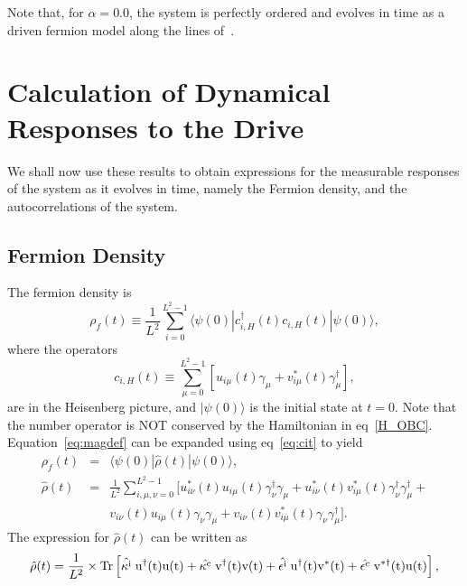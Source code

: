 \documentclass[a4paper,10pt]{article}
\begin{document}
Note that, for $\alpha=0.0$, the system is perfectly ordered and evolves in time as a driven fermion model along the lines of~\cite{arnab1}. 

\section{Calculation of Dynamical Responses to the Drive}
\label{sec:responses}
We shall now use these results to obtain expressions for the measurable responses of the system as it evolves in time, namely the  Fermion density, and the autocorrelations of the system. 

\subsection{Fermion Density}
\label{subsec:magcalc}
The fermion density is~\cite{arnab1} 
\begin{equation}
\label{eq:magdef}
\rho_f(t)\equiv  \frac{1}{L^2}\sum^{L^2-1}_{i=0} \langle \psi(0) | c^\dagger_{i,H} (t) c_{i,H}(t) |\psi(0)\rangle,
\end{equation}
where the operators 
\begin{equation}
\label{eq:cit}
c_{i,H}(t)\equiv \sum^{L^2-1}_{\mu=0} \left[u_{i\mu}(t)\gamma_\mu+v^\ast_{i\mu}(t)\gamma^\dagger_\mu\right],
\end{equation}
are in the Heisenberg picture, and $|\psi(0)\rangle$ is the initial state at $t=0$. Note that the number operator is NOT conserved by the Hamiltonian in eq~\ref{H_OBC}. Equation~\ref{eq:magdef} can be expanded using eq~\ref{eq:cit} to yield
\begin{eqnarray}
\label{eq:magops}
 \rho_f(t) &=& \langle\psi(0)|\hat{\rho}(t)|\psi(0)\rangle,\nonumber \\
 \hat{\rho}(t) &=& \frac{1}{L^2}\sum^{L^2-1}_{i,\mu,\nu = 0}\bigg[u^\ast_{i\nu}(t) u_{i\mu}(t)\gamma^\dagger_\nu\gamma_\mu + u^\ast_{i\nu}(t)v^\ast_{i\mu}(t)\gamma^\dagger_\nu\gamma^\dagger_\mu + \nonumber \\
  & & v_{i\nu}(t)u_{i\mu}(t)\gamma_\nu\gamma_\mu + v_{i\nu}(t)v^\ast_{i\mu}(t)\gamma_\nu\gamma^\dagger_\mu\bigg] .
\end{eqnarray}
The expression for $\hat{\rho}(t)$ can be written as
\begin{equation}
 \label{m:t}
 \hat{\rho}(t) = \frac{1}{L^2} \times \rm{Tr}\left[\hat{\kappa^i} \; u^\dagger(t)u(t) + \hat{\kappa^c} \; v^\dagger(t)v(t) + \hat{\epsilon^i} \; u^\dagger(t)v^\ast(t)+\hat{\epsilon^c} \; v^{\ast \dagger}(t)u(t)\right],
\end{equation}
\end{document}

